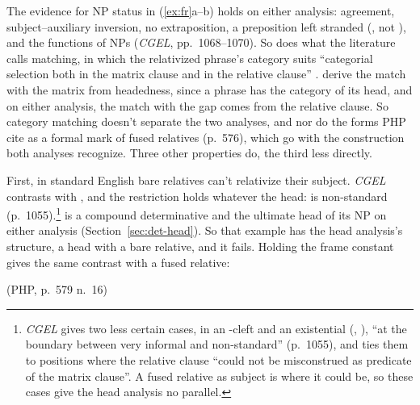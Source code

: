 The evidence for NP status in (\ref{ex:fr}a--b) holds on either analysis: agreement, subject--auxiliary inversion, no extraposition, a preposition left stranded (, not ), and the functions of NPs (\textit{CGEL}, pp.~1068--1070). So does what the literature calls matching, in which the relativized phrase's category suits \enquote{categorial selection both in the matrix clause and in the relative clause} \citep[349]{vanriemsdijk-2006-free-relatives}. \textcite[336--338]{bresnan1978free} derive the match with the matrix from headedness, since a phrase has the category of its head, and on either analysis, the match with the gap comes from the relative clause. So category matching doesn't separate the two analyses, and nor do the  forms PHP cite as a formal mark of fused relatives (p.~576), which go with the construction both analyses recognize. Three other properties do, the third less directly.

First, in standard English bare relatives can't relativize their subject. \textit{CGEL} contrasts  with , and the restriction holds whatever the head:  is non-standard (p.~1055).\footnote{\textit{CGEL} gives two less certain cases, in an -cleft and an existential (, ), \enquote{at the boundary between very informal and non-standard} (p.~1055), and ties them to positions where the relative clause \enquote{could not be misconstrued as predicate of the matrix clause}. A fused relative as subject is where it could be, so these cases give the head analysis no parallel.}  is a compound determinative and the ultimate head of its NP on either analysis (Section~\ref{sec:det-head}). So that example has the head analysis's structure, a head with a bare relative, and it fails. Holding the frame constant gives the same contrast with a fused relative:

\ea\label{ex:subj}
\ea {} (PHP, p.~579 n.~16)
\ex {}
\ex {}
\ex {}
\z\z

